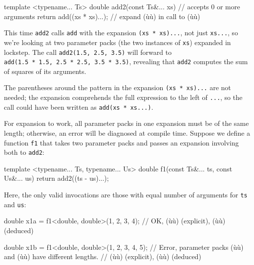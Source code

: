 \begin{emcppslisting}[emcppsbatch=e25]
template <typename... Ts>
double add2(const Ts&... xs)   // accepts 0 or more arguments
{
    return add((xs * xs)...);  // expand (ù{}ù) in call to (ù{}ù)
}
\end{emcppslisting}
    

\noindent This time \lstinline!add2! calls \lstinline!add! with the expansion
\lstinline!(xs!~\lstinline!*!~\lstinline!xs)...!, not just \lstinline!xs...!, so
we're looking at two parameter packs (the two instances of \lstinline!xs!)
expanded in lockstep. The call\linebreak%
\mbox{\lstinline!add2(1.5,!~\lstinline!2.5,!~\lstinline!3.5)!} will forward to
\lstinline!add(1.5!~\lstinline!*!~\lstinline!1.5,!~\lstinline!2.5!~\lstinline!*!~\lstinline!2.5,!~\lstinline!3.5!~\lstinline!*!~\lstinline!3.5)!,
revealing that \lstinline!add2! computes the sum of squares of its
arguments.

The parentheses around the pattern in the expansion
\lstinline!(xs!~\lstinline!*!~\lstinline!xs)...! are not needed; the expansion
comprehends the full expression to the left of \lstinline!...!, so the call
could have been written as \lstinline!add(xs!~\lstinline!*!~\lstinline!xs...)!.

For expansion to work, all parameter packs in one expansion must be of
the same length; otherwise, an error will be diagnosed at compile time.
Suppose we define a function \lstinline!f1! that takes two parameter packs
and passes an expansion involving both to \lstinline!add2!:

\begin{emcppslisting}[emcppsbatch=e25]
template <typename... Ts, typename... Us>
double f1(const Ts&... ts, const Us&... us)
{
    return add2((ts - us)...);
}
\end{emcppslisting}
    

\noindent Here, the only valid invocations are those with equal number of
arguments for \lstinline!ts! and \lstinline!us!:

\begin{emcppslisting}[emcppsbatch=e25]
double x1a = f1<double, double>(1, 2, 3, 4);
    // OK, (ù{}ù) (explicit), (ù{}ù) (deduced)

double x1b = f1<double, double>(1, 2, 3, 4, 5);
    // Error, parameter packs (ù{}ù) and (ù{}ù) have different lengths.
    // (ù{}ù) (explicit), (ù{}ù) (deduced)
\end{emcppslisting}
    

